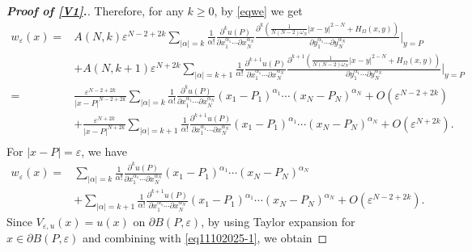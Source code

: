 \documentclass[10pt,a4paper]{amsart}
\newtheorem{comment}{Comment}
\newcommand\e\varepsilon
\begin{document}
\begin{proof}[\bf Proof of \eqref{V1}.]

                     Therefore, for any $k\ge 0$,
                     by \eqref{eqwe} we get
                \begin{align*}
					\!\!\!\!\!\!\!\!\!\!\!\!\!\!\!\!\!\!\!\!\!
                    w_\e(x)=&A(N,k)\e^{N-2+2k}
					\sum_{|\alpha|=k}\frac1{\alpha!}
					\frac{\partial^ku(P)}{\partial x_1^{\alpha_1}\cdots\partial x_N^{\alpha_N}}
					\frac{\partial^k\left(\frac1{N(N-2)\omega_N}|x-y|^{2-N}+H_{\Omega}(x,y)\right)}{\partial y_1^{\alpha_1}\cdots\partial y_N^{\alpha_N}}\Bigg|_{y=P}\\
                    &+A(N,k+1)\e^{N+2k}
					\sum_{|\alpha|=k+1}\frac1{\alpha!}
					\frac{\partial^{k+1}u(P)}{\partial x_1^{\alpha_1}\cdots\partial x_N^{\alpha_N}}
					\frac{\partial^{k+1}\left(\frac1{N(N-2)\omega_N}|x-y|^{2-N}+H_{\Omega}(x,y)\right)}{\partial y_1^{\alpha_1}\cdots\partial y_N^{\alpha_N}}\Bigg|_{y=P}\\
                    =&\frac{\e^{N-2+2k}}{|x-P|^{N-2+2k}}\sum_{|\alpha|=k}\frac1{\alpha!}
					\frac{\partial^ku(P)}{\partial x_1^{\alpha_1}\cdots\partial x_N^{\alpha_N}}(x_1-P_1)^{\alpha_1}\cdots(x_N-P_N)^{\alpha_N}+O(\e^{N-2+2k})\\
                    &+\frac{\e^{N+2k}}{|x-P|^{N+2k}}\sum_{|\alpha|=k+1}\frac1{\alpha!}
					\frac{\partial^{k+1}u(P)}{\partial x_1^{\alpha_1}\cdots\partial x_N^{\alpha_N}}(x_1-P_1)^{\alpha_1}\cdots(x_N-P_N)^{\alpha_N}+O(\e^{N+2k}).\\
				\end{align*}
                For $|x-P|=\e$, we have
                \begin{equation}\label{eq11102025-1}
                    \begin{aligned}
                    w_\e(x)=&\sum_{|\alpha|=k}\frac1{\alpha!}
					\frac{\partial^ku(P)}{\partial x_1^{\alpha_1}\cdots\partial x_N^{\alpha_N}}(x_1-P_1)^{\alpha_1}\cdots(x_N-P_N)^{\alpha_N}\\
                    &+\sum_{|\alpha|=k+1}\frac1{\alpha!}
					\frac{\partial^{k+1}u(P)}{\partial x_1^{\alpha_1}\cdots\partial x_N^{\alpha_N}}(x_1-P_1)^{\alpha_1}\cdots(x_N-P_N)^{\alpha_N}+O(\e^{N-2+2k}).
                    \end{aligned}
                \end{equation}
Since $V_{\e,u}(x)=u(x)$ on $\partial B(P,\e)$, by using Taylor expansion for $x\in\partial B(P,\e)$ and combining with \eqref{eq11102025-1}, we obtain

\end{proof}
\end{document}
